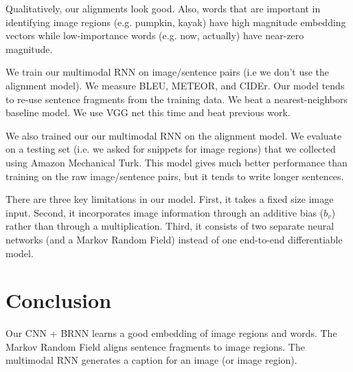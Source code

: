 \documentclass[a4paper]{article}
\begin{document}
Qualitatively, our alignments look good. Also, words that are important in
identifying image regions (e.g. pumpkin, kayak) have high magnitude embedding
vectors while low-importance words (e.g. now, actually) have near-zero 
magnitude.

We train our multimodal RNN on image/sentence pairs (i.e we don't use the 
alignment model). We measure
BLEU, METEOR, and CIDEr. Our model tends to re-use sentence fragments from
the training data. We beat a nearest-neighbors baseline model. We use VGG net
this time and beat previous work.

We also trained our our multimodal RNN on the alignment model. We
evaluate on a testing set (i.e. we asked for snippets for image regions) 
that we collected using Amazon Mechanical Turk. This
model gives much better performance than training on the raw image/sentence 
pairs, but it tends to write longer sentences.

There are three key limitations in our model. First, it takes a fixed size
image input. Second, it incorporates image information through an additive
bias ($b_v$) rather than through a multiplication. Third, it consists of
two separate neural networks (and a Markov Random Field) instead of
one end-to-end differentiable model.

\section{Conclusion}
Our CNN + BRNN learns a good embedding of image regions and words. The
Markov Random Field aligns sentence fragments to image regions. The 
multimodal RNN generates a caption for an image (or image region).
\end{document}

